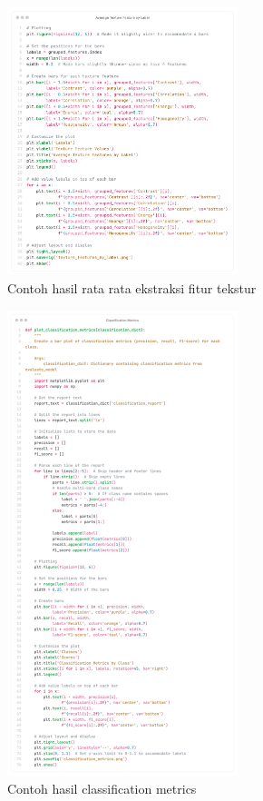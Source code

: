 \begin{figure}[H]
  \centering
  \includegraphics[width=0.6\textwidth]{figure/chapter-4-average_texture.png}
  \caption{Contoh hasil rata rata ekstraksi fitur tekstur}
  \label{fig:extract_rgb}
\end{figure}

\begin{figure}[H]
  \centering
  \includegraphics[width=0.6\textwidth]{figure/chapter-4-classification_metrics.png}
  \caption{Contoh hasil classification metrics}
  \label{fig:extract_rgb}
\end{figure}